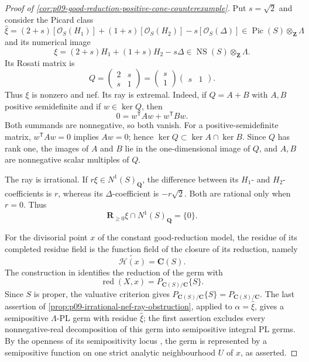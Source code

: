 \begin{proof}[Proof of
\cref{cor:p09-good-reduction-positive-cone-counterexample}]
Put \(s=\sqrt2\) and consider the Picard class
\[
 \widehat\xi=(2+s)[\mathcal O_S(H_1)]
        +(1+s)[\mathcal O_S(H_2)]-s[\mathcal O_S(\Delta)]
        \in\operatorname{Pic}(S)\otimes_{\mathbf Z}\Lambda
\]
and its numerical image
\begin{equation}
\label{eq:p09-explicit-irrational-nef-class}
               \xi=(2+s)H_1+(1+s)H_2-s\Delta
                 \in\operatorname{NS}(S)\otimes_{\mathbf Z}\Lambda.
\end{equation}
Its Rosati matrix is
\begin{equation}
\label{eq:p09-rank-one-rosati-matrix}
 Q=
 \begin{pmatrix}2&s\\s&1\end{pmatrix}
 =
 \begin{pmatrix}s\\1\end{pmatrix}
 \begin{pmatrix}s&1\end{pmatrix}.
\end{equation}
Thus \(\xi\) is nonzero and nef.  Its ray is extremal.  Indeed, if
\(Q=A+B\) with \(A,B\) positive semidefinite and if \(w\in\ker Q\), then
\[
                    0=w^{\mathsf T}Aw+w^{\mathsf T}Bw.
\]
Both summands are nonnegative, so both vanish.  For a positive-semidefinite
matrix, \(w^{\mathsf T}Aw=0\) implies \(Aw=0\); hence
\(\ker Q\subset\ker A\cap\ker B\).  Since \(Q\) has rank one, the images
of \(A\) and \(B\) lie in the one-dimensional image of \(Q\), and
\(A,B\) are nonnegative scalar multiples of \(Q\).

The ray is irrational.  If \(r\xi\in N^1(S)_{\mathbf Q}\), the difference
between its \(H_1\)- and \(H_2\)-coefficients is \(r\), whereas its
\(\Delta\)-coefficient is \(-r\sqrt2\).  Both are rational only when
\(r=0\).  Thus
\[
                   \mathbf R_{\geq0}\xi\cap N^1(S)_{\mathbf Q}=\{0\}.
\]

For the divisorial point \(x\) of the constant good-reduction model, the
residue of its completed residue field is the function field of the closure
of its reduction, namely
\[
 \widetilde{\mathscr H(x)}=\mathbf C(S).
\]
The construction in \cite[\S6.13]{GJR26} identifies the reduction of the
germ with
\[
 \operatorname{red}(X,x)=P_{\mathbf C(S)/\mathbf C}\{S\}.
\]
Since \(S\) is proper, the valuative criterion gives
\(P_{\mathbf C(S)/\mathbf C}\{S\}=P_{\mathbf C(S)/\mathbf C}\).
The last assertion of
\cref{prop:p09-irrational-nef-ray-obstruction}, applied to
\(\alpha=\widehat\xi\),
gives a semipositive \(\Lambda\)-PL germ with residue \(\widehat\xi\); the first
assertion excludes every nonnegative-real decomposition of this germ into
semipositive integral PL germs.  By the openness of its
semipositivity locus \cite[Remark~7.3(4)]{GJR26}, the germ is represented by
a semipositive function on one strict analytic neighbourhood \(U\) of
\(x\), as asserted.
\end{proof}

